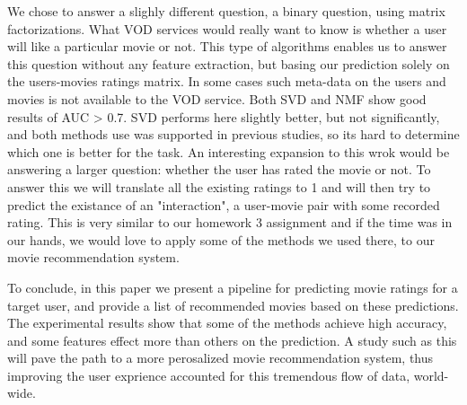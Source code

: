 We chose to answer a slighly different question, a binary question, using matrix factorizations. What VOD services would really want to know is whether a user will like a particular movie or not. This type of algorithms enables us to answer this question without any feature extraction, but basing our prediction solely on the users-movies ratings matrix. In some cases such meta-data on the users and movies is not available to the VOD service. Both SVD and NMF show good results of AUC > 0.7. SVD performs here slightly better, but not significantly, and both methods use was supported in previous studies, so its hard to determine which one is better for the task. An interesting expansion to this wrok would be answering a larger question: whether the user has rated the movie or not. To answer this we will translate all the existing ratings to 1 and will then try to predict the existance of an "interaction", a user-movie pair with some recorded rating. This is very similar to our homework 3 assignment and if the time was in our hands, we would love to apply some of the methods we used there, to our movie recommendation system.

To conclude, in this paper we present a pipeline for predicting movie ratings for a target user, and provide a list of recommended movies based on these predictions. The experimental results show that some of the methods achieve high accuracy, and some features effect more than others on the prediction. A study such as this will pave the path to a more perosalized movie recommendation system, thus improving the user exprience accounted for this tremendous flow of data, world-wide.
